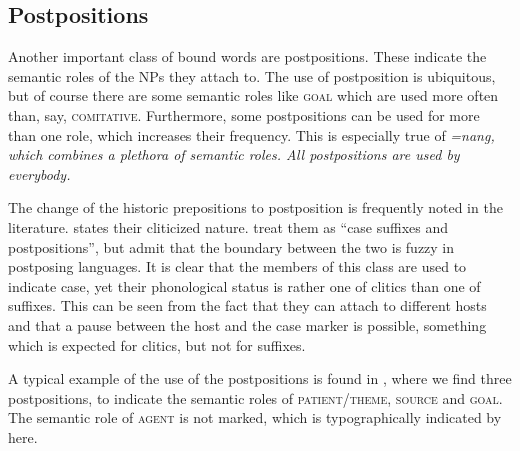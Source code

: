 % 
%



\subsection{Postpositions}\label{sec:morph:Postpositions}
Another important class of bound words are postpositions. These indicate the semantic roles of the NPs they attach to. The use of postposition is ubiquitous, but of course there are some semantic roles like \textsc{goal} which are used more often than, say, \textsc{comitative}. Furthermore, some postpositions can be used for more than one role, which increases their frequency. This is especially true of \em =nang\em, which combines a plethora of semantic roles. All postpositions are used by everybody.

The change of the historic prepositions to postposition is frequently noted in the literature. \citet[30f]{Adelaar1991} states their cliticized nature. \citet{SmithEtAl2004} treat them as ``case suffixes and postpositions'', but admit that the boundary between the two is fuzzy in postposing languages. It is clear that the members of this class are used to indicate case, yet their phonological status is rather one of clitics than one of suffixes. This can be seen from the fact that they can attach to different hosts and that a pause between the host and the case marker is possible, something which is expected for clitics, but not for suffixes.

A typical example of the use of the postpositions is found in , where we find three postpositions, to indicate the semantic roles of \textsc{patient}/\textsc{theme}, \textsc{source} and \textsc{goal}. The semantic role of \textsc{agent} is not marked, which is typographically indicated by \zero{} here.


